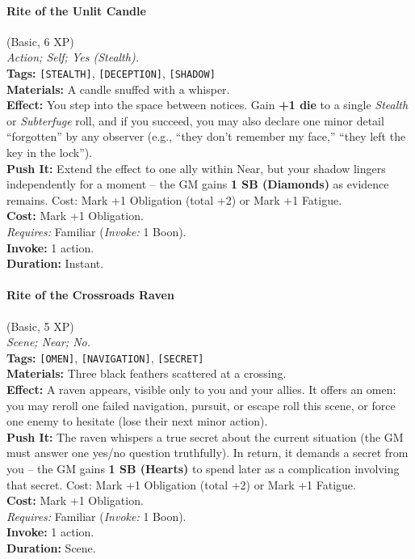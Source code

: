 \paragraph{Rite of the Unlit Candle} (Basic, 6 XP) \hfill \\
\emph{Action; Self; Yes (Stealth).} \\
\textbf{Tags:} \texttt{[STEALTH]}, \texttt{[DECEPTION]}, \texttt{[SHADOW]} \\
\textbf{Materials:} A candle snuffed with a whisper. \\
\textbf{Effect:} You step into the space between notices. Gain \textbf{+1 die} to a single \textit{Stealth} or \textit{Subterfuge} roll, and if you succeed, you may also declare one minor detail ``forgotten'' by any observer (e.g., ``they don't remember my face,'' ``they left the key in the lock''). \\
\textbf{Push It:} Extend the effect to one ally within Near, but your shadow lingers independently for a moment -- the GM gains \textbf{1 SB (Diamonds)} as evidence remains. Cost: Mark +1 Obligation (total +2) or Mark +1 Fatigue. \\
\textbf{Cost:} Mark +1 Obligation. \\
\textit{Requires:} Familiar (\textit{Invoke:} 1 Boon). \\
\textbf{Invoke:} 1 action. \\
\textbf{Duration:} Instant.

\paragraph{Rite of the Crossroads Raven} (Basic, 5 XP) \hfill \\
\emph{Scene; Near; No.} \\
\textbf{Tags:} \texttt{[OMEN]}, \texttt{[NAVIGATION]}, \texttt{[SECRET]} \\
\textbf{Materials:} Three black feathers scattered at a crossing. \\
\textbf{Effect:} A raven appears, visible only to you and your allies. It offers an omen: you may reroll one failed navigation, pursuit, or escape roll this scene, or force one enemy to hesitate (lose their next minor action). \\
\textbf{Push It:} The raven whispers a true secret about the current situation (the GM must answer one yes/no question truthfully). In return, it demands a secret from you -- the GM gains \textbf{1 SB (Hearts)} to spend later as a complication involving that secret. Cost: Mark +1 Obligation (total +2) or Mark +1 Fatigue. \\
\textbf{Cost:} Mark +1 Obligation. \\
\textit{Requires:} Familiar (\textit{Invoke:} 1 Boon). \\
\textbf{Invoke:} 1 action. \\
\textbf{Duration:} Scene.

